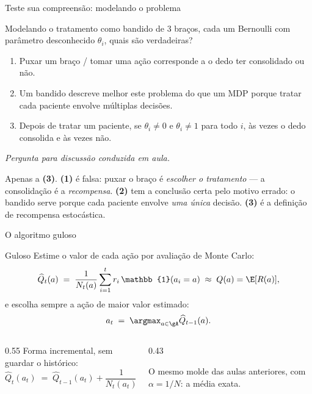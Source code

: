 \documentclass[aspectratio=169, 10pt]{beamer}
\newcommand{\paradiscussao}{\smallskip
  {\footnotesize\color{rlCinza}\itshape Pergunta para discussão conduzida em aula.}}
\newcommand{\Qhat}{\widehat{Q}}
\newcommand{\Nc}{N}                         %
\newcommand{\one}{\mathbb{1}}
\begin{document}
\begin{frame}{Teste sua compreensão: modelando o problema}
  \begin{quizbox}[fontupper=\footnotesize]{}
    Modelando o tratamento como bandido de 3 braços, cada um Bernoulli
    com parâmetro desconhecido $\theta_i$, quais são verdadeiras?
    \begin{enumerate}\setlength{\itemsep}{0ex}
      \item Puxar um braço / tomar uma ação corresponde a o dedo ter
            consolidado ou não.
      \item Um bandido descreve melhor este problema do que um MDP porque
            tratar cada paciente envolve múltiplas decisões.
      \item Depois de tratar um paciente, se $\theta_i \ne 0$ e
            $\theta_i \ne 1$ para todo $i$, às vezes o dedo consolida e às
            vezes não.
    \end{enumerate}
    \paradiscussao
  \end{quizbox}

  \pause

  \begin{respbox}[fontupper=\footnotesize]
    Apenas a \textbf{(3)}. \;
    \textbf{(1)} é falsa: puxar o braço é \emph{escolher o tratamento} --- a
    consolidação é a \emph{recompensa}. \;
    \textbf{(2)} tem a conclusão certa pelo motivo errado: o bandido serve
    porque cada paciente envolve \emph{uma única} decisão. \;
    \textbf{(3)} é a definição de recompensa estocástica.
  \end{respbox}
\end{frame}

\begin{frame}{O algoritmo guloso}
  \begin{algbox}{Guloso}
    Estime o valor de cada ação por avaliação de Monte Carlo:
    \[
      \Qhat_t(a) \;=\; \frac{1}{\Nc_t(a)} \sum_{i=1}^{t} r_i\,\one(a_i = a)
      \;\approx\; Q(a) = \E[R(a)],
    \]
    e escolha sempre a ação de maior valor estimado:
    \[
      a_t \;=\; \argmax_{a \in \gA} \Qhat_{t-1}(a).
    \]
  \end{algbox}

  \begin{columns}[T]
    \begin{column}{0.55\textwidth}
      Forma incremental, sem guardar o histórico:
      \[
        \Qhat_{t}(a_t) \;=\; \Qhat_{t-1}(a_t)
          + \frac{1}{\Nc_t(a_t)}\bigl(r_t - \Qhat_{t-1}(a_t)\bigr).
      \]
    \end{column}
    \begin{column}{0.43\textwidth}
      \begin{ideiabox}
        O mesmo molde das aulas anteriores, com $\alpha = 1/\Nc$: a média
        exata.
      \end{ideiabox}
    \end{column}
  \end{columns}
\end{frame}
\end{document}

